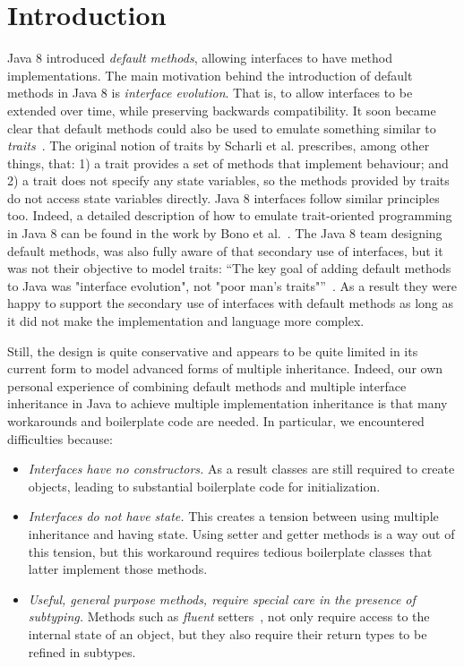 \section{Introduction}\label{sec:intro}

Java 8 introduced \emph{default methods}, allowing interfaces to have
method implementations. The main motivation behind the introduction of
default methods in Java 8 is \emph{interface evolution}. That is, to
allow interfaces to be extended over time, while preserving backwards
compatibility. It soon became clear that default methods could also be
used to emulate something similar to \emph{traits}~\cite{scharli03traits}. The
original notion of traits by Scharli et al. prescribes, among other
things, that: 1) a trait provides a set of methods that implement
behaviour; and 2) a trait does not specify any state variables, so the
methods provided by traits do not access state variables
directly. Java 8 interfaces follow similar principles too. Indeed, a
detailed description of how to emulate trait-oriented programming in
Java 8 can be found in the work by Bono et al.~\cite{bono14}. The Java 8
team designing default methods, was also fully aware of that secondary
use of interfaces, but it was not their objective to model traits:
``The key goal of adding default methods to Java was "interface
evolution", not "poor man's traits"''~\cite{goetz13default}. As a result
they were happy to support the secondary use of interfaces with
default methods as long as it did not make the implementation and
language more complex.
 
Still, the design is quite conservative and appears to be quite limited
 in its current form to model advanced forms of multiple inheritance.
Indeed, our own personal experience of combining default methods 
and multiple interface inheritance in Java to achieve multiple implementation 
inheritance is that many workarounds and boilerplate code are needed. 
In particular, we encountered difficulties because:

\begin{itemize}

\item {\em Interfaces have no constructors.} As a result classes are 
still required to create objects, leading to substantial boilerplate 
code for initialization.

\item {\em Interfaces do not have state.} This creates a tension between 
 using multiple inheritance and having state. Using setter and
  getter methods is a way out of this tension, but this workaround
  requires tedious boilerplate classes that latter implement those
  methods.

\item {\em Useful, general purpose methods, require special care in
  the presence of subtyping.} Methods such as
  \emph{fluent} setters~\cite{fowler2005fluentinterface}, not only require access to the
  internal state of an object, but they also require their return types to be
  refined in subtypes.

\end{itemize}

